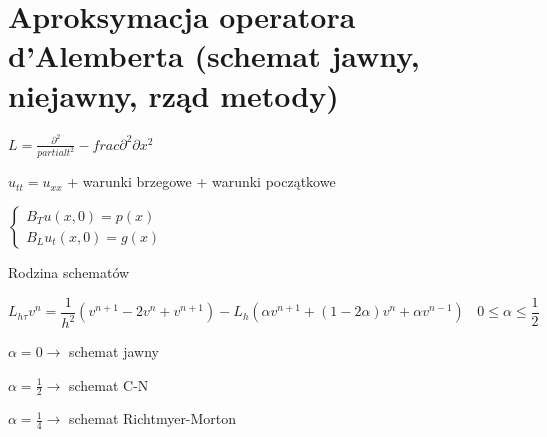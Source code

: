 \section{Aproksymacja operatora d'Alemberta (schemat jawny, niejawny, rząd metody)}

$L = \frac{\partial ^2}{partial t^2} - frac{\partial ^2}{\partial x^2}$

$u_{tt} = u_{xx}$ + warunki brzegowe + warunki początkowe

$\left\{\begin{matrix} B_T u(x,0) = p(x) \\ B_L u_t(x,0) = g(x) \end{matrix}\right.$

Rodzina schematów

\[ L_{h\tau}v^n = \frac{1}{h^2}(v^{n+1} - 2v^n + v^{n+1}) - L_h(\alpha v^{n+1} + (1-2\alpha)v^n + \alpha v^{n-1})\ \ \ \ 0 \leqslant \alpha \leqslant \frac{1}{2}\]

$\alpha = 0 \rightarrow$ schemat jawny

$\alpha = \frac{1}{2} \rightarrow$ schemat C-N

$\alpha = \frac{1}{4} \rightarrow$ schemat Richtmyer-Morton